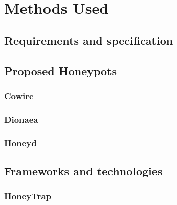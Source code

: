 \chapter{Methods Used}

\section{Requirements and specification}

\section{Proposed Honeypots}

\subsection{Cowire}

\subsection{Dionaea}

\subsection{Honeyd}

\section{Frameworks and technologies}

\subsection{HoneyTrap}
